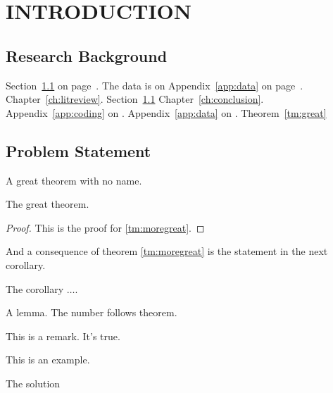 \chapter{INTRODUCTION}
\label{ch:intro}

\section{Research Background}
\label{sec:intro-bg}
Section~\ref{sec:intro-bg} on page~\pageref{sec:intro-bg}. The data is on Appendix~\ref{app:data} on page~\pageref{app:data}. Chapter~\ref{ch:litreview}. Section~\ref{sec:intro-bg} Chapter~\ref{ch:conclusion}. Appendix~\ref{app:coding} on \pageref{app:coding}. Appendix~\ref{app:data} on \pageref{app:data}. Theorem~\ref{tm:great}

\lipsum[3-4]

\section{Problem Statement}

\begin{theorem}\label{tm:great}
    A great theorem with no name.
\end{theorem}

\begin{theorem}
    \label{tm:moregreat}
    The great theorem.
\end{theorem}

\begin{proof}
This is the proof for \ref{tm:moregreat}.
\end{proof}

And a consequence of theorem \ref{tm:moregreat} is the statement in the next 
corollary.

\begin{corollary}
The corollary $\ldots$.
\end{corollary}

\begin{lemma}
A lemma. The number follows theorem.
\end{lemma}

\begin{remark}
This is a remark. It's true.
\end{remark}

\begin{example}
This is an example.
\end{example}

\begin{solution}
The solution
\end{solution}

